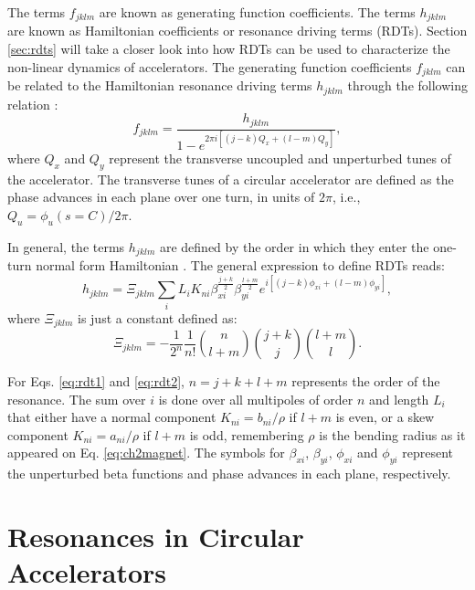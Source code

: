 The terms $f_{jklm}$ are known as generating function coefficients. The terms $h_{jklm}$ are known as Hamiltonian coefficients or resonance driving terms (RDTs). Section \ref{sec:rdts} will take a closer look into how RDTs can be used to characterize the non-linear dynamics of accelerators. The generating function coefficients $f_{jklm}$ can be related to the Hamiltonian resonance driving terms $h_{jklm}$ through the following relation \cite{cernthesis1,bartolini}:
\begin{equation}
    \label{eq:handf}
    f_{jklm}=\frac{h_{jklm}}{1-e^{2\pi i \left[ \left( j-k \right) Q_x + \left( l-m\right) Q_y \right] }},
\end{equation}
where $Q_x$ and $Q_y$ represent the transverse uncoupled and unperturbed tunes of the accelerator. The transverse tunes of a circular accelerator are defined as the phase advances in each plane over one turn, in units of $2\pi$, i.e., $Q_u=\phi_u(s=C)/2\pi$. 

In general, the terms $h_{jklm}$ are defined by the order in which they enter the one-turn normal form Hamiltonian \cite{bartolini}. The general expression to define RDTs reads:
\begin{equation}
    \label{eq:rdt1}
    h_{jklm}=\Xi _{jklm} \sum_i L_i K_{ni} \beta_{xi}^{\frac{j+k}{2}} \beta_{yi}^{\frac{l+m}{2}} e^{i\left[ (j-k)\phi_{xi} +(l-m) \phi_{yi} \right]},
\end{equation}
where $\Xi _{jklm}$ is just a constant defined as:
\begin{equation}
    \label{eq:rdt2}
    \Xi _{jklm} = -\frac{1}{2^n}\frac{1}{n!} {\binom{n}{l+m}} {\binom{j+k}{j}}{\binom{l+m}{l}}.
\end{equation}

For Eqs. \ref{eq:rdt1} and \ref{eq:rdt2}, $n=j+k+l+m$ represents the order of the resonance. The sum over $i$ is done over all multipoles of order $n$ and length $L_i$ that either have a normal component $K_{ni}=b_{ni}/\rho$ if $l+m$ is even, or a skew component $K_{ni}=a_{ni}/\rho$ if $l+m$ is odd, remembering $\rho$ is the bending radius as it appeared on Eq. \ref{eq:ch2magnet}. The symbols for $\beta_{xi}$, $\beta_{yi}$, $\phi_{xi}$ and $\phi_{yi}$ represent the unperturbed beta functions and phase advances in each plane, respectively.

\section{\label{sec:resonances}Resonances in Circular Accelerators}

